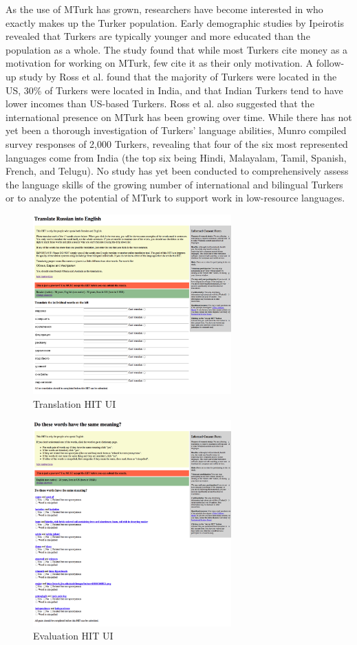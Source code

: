 \documentclass[11pt]{article}
\begin{document}
As the use of MTurk has grown, researchers have become interested in who exactly makes up the Turker population. Early demographic studies by Ipeirotis revealed that Turkers are typically younger and more educated than the population as a whole. The study found that while most Turkers cite money as a motivation for working on MTurk, few cite it as their only motivation. A follow-up study by Ross et al. found that the majority of Turkers were located in the US, 30\% of Turkers were located in India, and that Indian Turkers tend to have lower incomes than US-based Turkers. Ross et al. also suggested that the international presence on MTurk has been growing over time. While there has not yet been a thorough investigation of Turkers' language abilities, Munro compiled survey responses of 2,000 Turkers, revealing that four of the six most represented languages come from India (the top six being Hindi, Malayalam, Tamil, Spanish, French, and Telugu). No study has yet been conducted to comprehensively assess the language skills of the growing number of international and bilingual Turkers or to analyze the potential of MTurk to support work in low-resource languages. 


\begin{figure}[h]
\centering
\includegraphics[width=3in]{figures/vocabulary_hit_mturk}
\caption{Translation HIT UI}
\label{tranhit}
\end{figure}

\begin{figure}[h]
\centering
\includegraphics[width=3in]{figures/synonyms_hit_mturk}
\caption{Evaluation HIT UI}
\label{synhit}
\end{figure}
\end{document}
